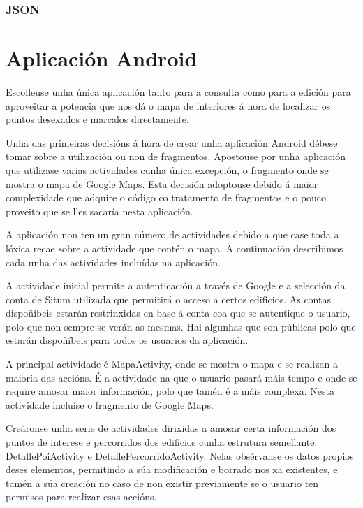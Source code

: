 \subsubsection{JSON}


\section{Aplicación Android}
Escolleuse unha única aplicación tanto para a consulta como para a edición para aproveitar a potencia que nos dá o mapa de interiores á hora de localizar os puntos desexados e marcalos directamente.

Unha das primeiras decisións á hora de crear unha aplicación Android débese tomar sobre a utilización ou non de fragmentos. Apostouse por unha aplicación que utilizase varias actividades cunha única excepción, o fragmento onde se mostra o mapa de Google Maps. Esta decisión adoptouse debido á maior complexidade que adquire o código co tratamento de fragmentos e o pouco proveito que se lles sacaría nesta aplicación.

A aplicación non ten un gran número de actividades debido a que case toda a lóxica recae sobre a actividade que contén o mapa. A continuación describimos cada unha das actividades incluídas na aplicación.

A actividade inicial permite a autenticación a través de Google e a selección da conta de Situm utilizada que permitirá o acceso a certos edificios. As contas dispoñíbeis estarán restrinxidas en base á conta coa que se autentique o usuario, polo que non sempre se verán as mesmas. Hai algunhas que son públicas polo que estarán dispoñíbeis para todos os usuarios da aplicación.

A principal actividade é MapaActivity, onde se mostra o mapa e se realizan a maioría das accións. É a actividade na que o usuario pasará máis tempo e onde se require amosar maior información, polo que tamén é a máis complexa. Nesta actividade incluíse o fragmento de Google Maps.

Creáronse unha serie de actividades dirixidas a amosar certa información dos puntos de interese e percorridos dos edificios cunha estrutura semellante: DetallePoiActivity e DetallePercorridoActivity. Nelas obsérvanse os datos propios deses elementos, permitindo a súa modificación e borrado nos xa existentes, e tamén a súa creación no caso de non existir previamente se o usuario ten permisos para realizar esas accións.




